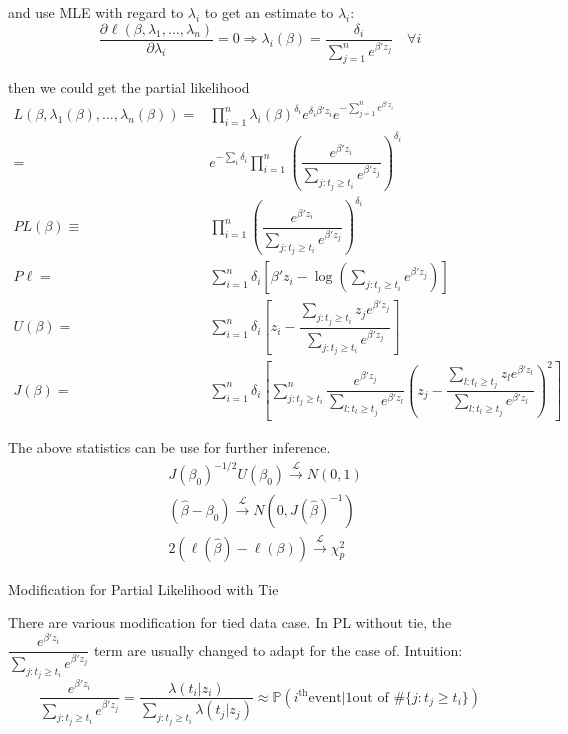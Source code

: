 and use MLE with regard to $ \lambda _i $ to get an estimate to $ \lambda _i $: 
\begin{equation}
    \dfrac{\partial^{} \ell(\beta ,\lambda _1,\ldots,\lambda _n)}{\partial \lambda _i^{}}=0\Rightarrow \lambda _i(\beta )=\dfrac{\delta _i}{\sum_{j=1}^ne^{\beta 'z_j}} \quad \forall i
\end{equation}

then we could get the partial likelihood
\begin{align}
    L(\beta ,\lambda _1(\beta ),\ldots,\lambda _n(\beta ))=&\prod_{i=1}^n\lambda _i(\beta )^{\delta _i}e^{\delta _i\beta 'z_i}e^{-\sum_{j=1}^ne^{\beta 'z_i}}\\
    =&e^{-\sum_i\delta _i}\prod_{i=1}^n\left( \dfrac{e^{\beta 'z_i}}{\sum_{j:t_j\geq t_i}e^{\beta 'z_j}} \right)^{\delta _i}\\
    PL(\beta )\equiv&\prod_{i=1}^n\left( \dfrac{e^{\beta 'z_i}}{\sum_{j:t_j\geq t_i}e^{\beta 'z_j}} \right)^{\delta_i}\\
    P\ell=&\sum_{i=1}^n\delta _i\left[ \beta 'z_i-\log\left(\sum_{j:t_j\geq t_i}e^{\beta 'z_j}\right) \right]\\
    U(\beta )=&\sum_{i=1}^n\delta _i\left[ z_i-\dfrac{\sum_{j:t_j\geq t_i}z_je^{\beta 'z_j}}{\sum_{j:t_j\geq t_i}e^{\beta 'z_j}} \right]\\
    J(\beta )=&\sum_{i=1}^n\delta _i\left[ \sum_{j:t_j\geq t_i}^n \dfrac{e^{\beta 'z_j}}{\sum_{l:t_l\geq t_j}e^{\beta 'z_l}} \left( z_j-\dfrac{\sum_{l:t_l\geq t_j}z_le^{\beta 'z_l}}{\sum_{l:t_l\geq t_j}e^{\beta 'z_l}} \right)^2 \right]
\end{align}

The above statistics can be use for further inference.
\begin{align}
    &J(\beta _0)^{-1/2}U(\beta _0)\xrightarrow[]{\mathscr{L}} N(0,1)\\
    &(\hat{\beta }-\beta _0)\xrightarrow[]{\mathscr{L}} N(0,J(\hat{\beta })^{-1})\\
    &2(\ell(\hat{\beta })-\ell(\beta))\xrightarrow[]{\mathscr{L}} \chi^2_p
\end{align}

\begin{point}
    Modification for Partial Likelihood with Tie
\end{point}

There are various modification for tied data case. In PL without tie, the $ \dfrac{e^{\beta 'z_i}}{\sum_{j:t_j\geq t_i}e^{\beta 'z_j}} $ term are usually changed to adapt for the case of. Intuition:
\begin{equation}
    \dfrac{e^{\beta 'z_i}}{\sum_{j:t_j\geq t_i}e^{\beta 'z_j}}=\dfrac{\lambda (t_i|z_i)}{\sum_{j:t_j\geq t_i}\lambda (t_j|z_j)}\approx \mathbb{P}\left( i^\mathrm{th} \text{event}|1\text{out of }\# \{j:t_j\geq t_i\}  \right) 
\end{equation}

